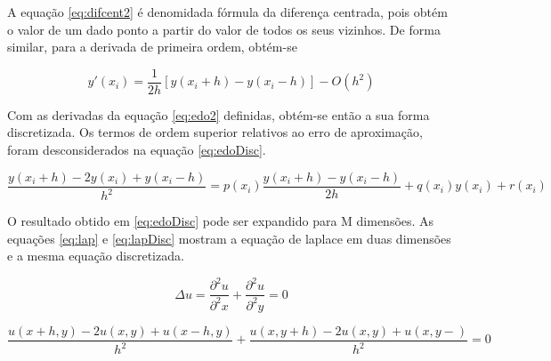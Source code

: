 A equação \ref{eq:difcent2} é denomidada fórmula da diferença centrada, pois obtém o valor de um dado ponto a partir do valor de todos os seus vizinhos. De forma similar, para a derivada de primeira ordem, obtém-se

\begin{equation}
    \label{eq:difcent}
    y'(x_i) = \frac{1}{2h}[y(x_i + h) - y(x_i - h)] - O(h^{2})
\end{equation}

Com as derivadas da equação \ref{eq:edo2} definidas, obtém-se então a sua forma discretizada. Os termos de ordem superior relativos ao erro de aproximação, foram desconsiderados na equação \ref{eq:edoDisc}.

\begin{equation}
    \label{eq:edoDisc}
   \frac{y(x_i + h) - 2y(x_i) +y(x_i - h)}{h^2} = p(x_i) \frac{y(x_i + h) - y(x_i - h)}{2h} +q(x_i)y(x_i) + r(x_i)
\end{equation}


O resultado obtido em  \ref{eq:edoDisc} pode ser expandido para M dimensões. As equações \ref{eq:lap} e \ref{eq:lapDisc} mostram a equação de laplace em duas dimensões e a mesma equação discretizada.

\begin{equation}
    \label{eq:lap}
    \Delta u = \frac{\partial^2 u}{\partial^2 x} + \frac{\partial^2 u}{\partial^2 y} = 0
\end{equation}

\begin{equation}
    \label{eq:lapDisc}
   \frac{u(x + h, y) - 2u(x, y) +u(x - h, y)}{h^2} +
   \frac{u(x, y + h) - 2u(x, y) +u(x, y - )}{h^2} = 0
\end{equation}
